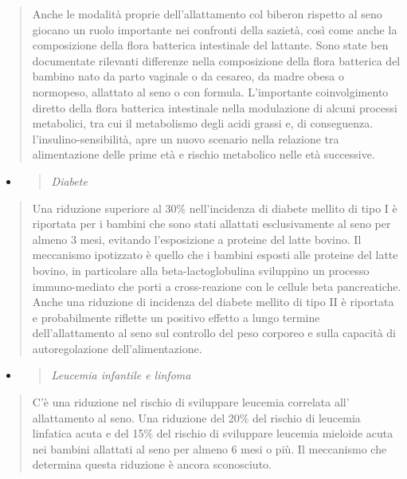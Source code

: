 \documentclass[]{article}
\begin{document}
\begin{quote}
Anche le modalità proprie dell'allattamento col biberon rispetto al seno
giocano un ruolo importante nei confronti della sazietà, così come anche
la composizione della flora batterica intestinale del lattante. Sono
state ben documentate rilevanti differenze nella composizione della
flora batterica del bambino nato da parto vaginale o da cesareo, da
madre obesa o normopeso, allattato al seno o con formula. L'importante
coinvolgimento diretto della flora batterica intestinale nella
modulazione di alcuni processi metabolici, tra cui il metabolismo degli
acidi grassi e, di conseguenza. l'insulino-sensibilità, apre un nuovo
scenario nella relazione tra alimentazione delle prime età e rischio
metabolico nelle età successive.
\end{quote}

\begin{itemize}
\item
  \begin{quote}
  \emph{Diabete }
  \end{quote}
\end{itemize}

\begin{quote}
Una riduzione superiore al 30\% nell'incidenza di diabete mellito di
tipo I è riportata per i bambini che sono stati allattati esclusivamente
al seno per almeno 3 mesi, evitando l'esposizione a proteine del latte
bovino. Il meccanismo ipotizzato è quello che i bambini esposti alle
proteine del latte bovino, in particolare alla beta-lactoglobulina
sviluppino un processo immuno-mediato che porti a cross-reazione con le
cellule beta pancreatiche. Anche una riduzione di incidenza del diabete
mellito di tipo II è riportata e probabilmente riflette un positivo
effetto a lungo termine dell'allattamento al seno sul controllo del peso
corporeo e sulla capacità di autoregolazione dell'alimentazione.
\end{quote}

\begin{itemize}
\item
  \begin{quote}
  \emph{Leucemia infantile e linfoma }
  \end{quote}
\end{itemize}

\begin{quote}
C'è una riduzione nel rischio di sviluppare leucemia correlata all'
allattamento al seno. Una riduzione del 20\% del rischio di leucemia
linfatica acuta e del 15\% del rischio di sviluppare leucemia mieloide
acuta nei bambini allattati al seno per almeno 6 mesi o più. Il
meccanismo che determina questa riduzione è ancora sconosciuto.
\end{quote}
\end{document}
